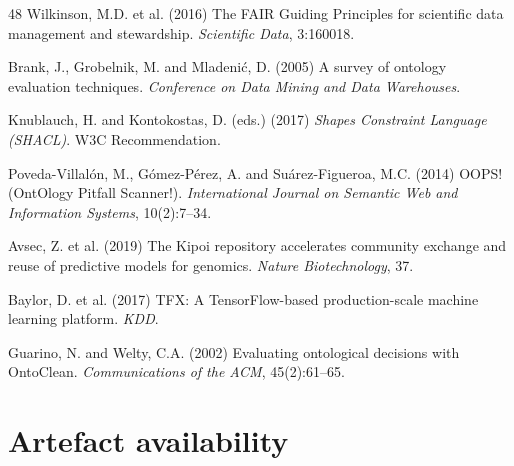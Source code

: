 \documentclass[Afour,sagev,times]{sagej}
\begin{document}
\begin{thebibliography}{48}
 Wilkinson, M.D. et al. (2016) The FAIR Guiding Principles for scientific data management and stewardship. \emph{Scientific Data}, 3:160018.

 Brank, J., Grobelnik, M. and Mladeni\'c, D. (2005) A survey of ontology evaluation techniques. \emph{Conference on Data Mining and Data Warehouses}.

 Knublauch, H. and Kontokostas, D. (eds.) (2017) \emph{Shapes Constraint Language (SHACL)}. W3C Recommendation.

 Poveda-Villalón, M., Gómez-Pérez, A. and Suárez-Figueroa, M.C. (2014) OOPS! (OntOlogy Pitfall Scanner!). \emph{International Journal on Semantic Web and Information Systems}, 10(2):7--34.

 Avsec, Z. et al. (2019) The Kipoi repository accelerates community exchange and reuse of predictive models for genomics. \emph{Nature Biotechnology}, 37.

 Baylor, D. et al. (2017) TFX: A TensorFlow-based production-scale machine learning platform. \emph{KDD}.

 Guarino, N. and Welty, C.A. (2002) Evaluating ontological decisions with OntoClean. \emph{Communications of the ACM}, 45(2):61--65.

\end{thebibliography}

\appendix

\section{Artefact availability}\label{app:avail}
\end{document}
